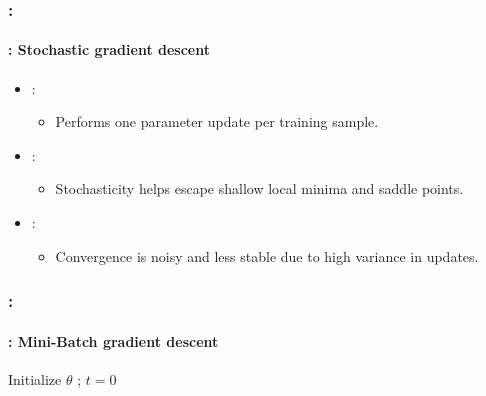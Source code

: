 \documentclass[xcolor=table]{beamer}
\begin{document}
\begin{frame}
	\frametitle{\insertshortsubtitle: \insertsection}
	\framesubtitle{\insertsubsection: Stochastic gradient descent}

	\begin{itemize}
		\item {}: 
		\begin{itemize}
			\item Performs one parameter update per training sample.
		\end{itemize}
		\item {}: 
		\begin{itemize}
			\item Stochasticity helps escape shallow local minima and saddle points.
		\end{itemize}
		\item {}: 
		\begin{itemize}
			\item Convergence is noisy and less stable due to high variance in updates.
		\end{itemize}	
	\end{itemize}

\end{frame}


\begin{frame}
	\frametitle{\insertshortsubtitle: \insertsection}
	\framesubtitle{\insertsubsection: Mini-Batch gradient descent}

	\begin{algorithm}[H]
		\KwResult{$ \theta $}
		Initialize $ \theta $ ; $ t = 0 $\;
		\caption{Mini-Batch gradient descent}
	\end{algorithm}

\end{frame}
\end{document}
